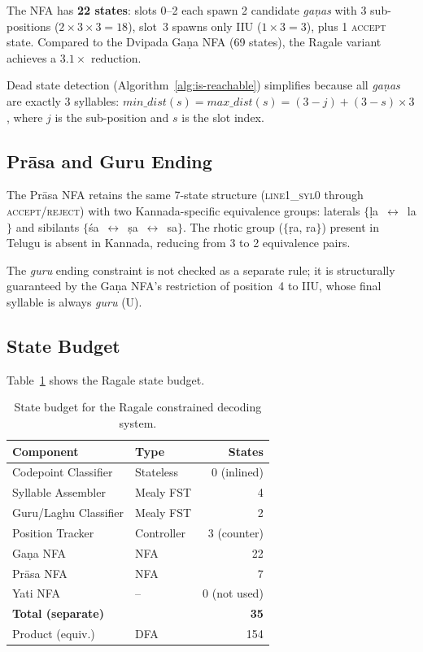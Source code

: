 \documentclass[11pt]{article}
\begin{document}
The NFA has \textbf{22 states}: slots 0--2 each spawn 2 candidate \textit{ga\d{n}as}
with 3 sub-positions ($2 \times 3 \times 3 = 18$), slot~3 spawns only
IIU ($1 \times 3 = 3$), plus 1 \textsc{accept} state. Compared to the
Dvipada Ga\d{n}a NFA (69 states), the Ragale variant achieves a
$3.1\times$ reduction.

Dead state detection (Algorithm~\ref{alg:is-reachable}) simplifies because
all \textit{ga\d{n}as} are exactly 3 syllables: $\textit{min\_dist}(s) =
\textit{max\_dist}(s) = (3 - j) + (3 - s) \times 3$, where $j$ is the
sub-position and $s$ is the slot index.

\subsection{Pr\=asa and Guru Ending}

The Pr\=asa NFA retains the same 7-state structure
(\textsc{line1\_syl0} through \textsc{accept}/\textsc{reject}) with two
Kannada-specific equivalence groups: laterals
$\{$\d{l}a~$\leftrightarrow$~la$\}$ and sibilants
$\{$\'{s}a~$\leftrightarrow$~\d{s}a~$\leftrightarrow$~sa$\}$.
The rhotic group ($\{$\d{r}a, ra$\}$) present in Telugu is absent in
Kannada, reducing from 3 to 2 equivalence pairs.

The \textit{guru} ending constraint is not checked as a separate rule;
it is structurally guaranteed by the Ga\d{n}a NFA's restriction of
position~4 to IIU, whose final syllable is always \textit{guru} (U).

\subsection{State Budget}

Table~\ref{tab:ragale_states} shows the Ragale state budget.

\begin{table}[h]
\centering
\small
\caption{State budget for the Ragale constrained decoding system.}
\label{tab:ragale_states}
\begin{tabular}{llr}
\toprule
\textbf{Component} & \textbf{Type} & \textbf{States} \\
\midrule
Codepoint Classifier  & Stateless & 0 (inlined) \\
Syllable Assembler    & Mealy FST & 4 \\
Guru/Laghu Classifier & Mealy FST & 2 \\
Position Tracker      & Controller & 3 (counter) \\
Ga\d{n}a NFA          & NFA & 22 \\
Pr\=asa NFA           & NFA & 7 \\
Yati NFA              & -- & 0 (not used) \\
\midrule
\textbf{Total (separate)} & & \textbf{35} \\
Product (equiv.)      & DFA & 154 \\
\bottomrule
\end{tabular}
\end{table}
\end{document}
